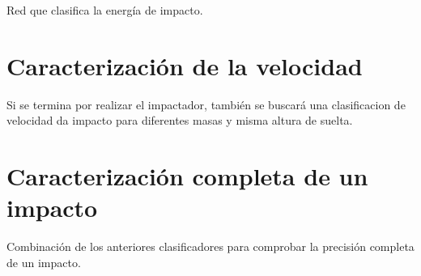 Red que clasifica la energía de impacto.

\clearpage



\section{Caracterización de la velocidad}

Si se termina por realizar el impactador, también se buscará una clasificacion de velocidad da impacto para diferentes masas y misma altura de suelta.

\clearpage



\section{Caracterización completa de un impacto}

Combinación de los anteriores clasificadores para comprobar la precisión completa de un impacto.

\clearpage